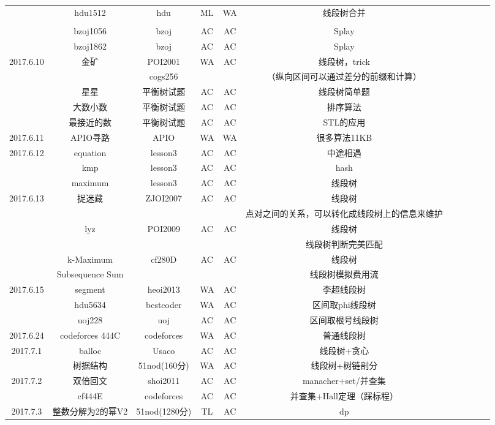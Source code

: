 \documentclass[landscape]{article}
\begin{document}
\begin{longtable}{ccccccccccc}
  & hdu1512 & hdu & ML & WA & 线段树合并\\
  & & & & & \color{red}{（拍了一万组没有出错，不知道怎么回事）}\\
   & bzoj1056 & bzoj & AC & AC & Splay\\
   & bzoj1862 & bzoj & AC & AC & Splay\\
  \hline
  2017.6.10 & 金矿 & POI2001 & WA & AC & 线段树，trick\\
  & & cogs256 & & & （纵向区间可以通过差分的前缀和计算）\\
  & 星星 & 平衡树试题 & AC & AC & 线段树简单题\\
   & 大数小数 & 平衡树试题 & AC & AC & 排序算法\\
   & 最接近的数 & 平衡树试题 & AC & AC & STL的应用\\
  \hline
  2017.6.11 & APIO寻路 & APIO & WA & WA & 很多算法11KB\\
  \hline
  2017.6.12 & equation & lesson3 & AC & AC & 中途相遇\\
   & kmp & lesson3 & AC & AC & hash\\
   & maximum & lesson3 & AC & AC & 线段树\\
  \hline
  2017.6.13 & 捉迷藏 & ZJOI2007 & AC & AC & 线段树\\
  & & & & & 点对之间的关系，可以转化成线段树上的信息来维护\\
   & lyz & POI2009 & AC & AC & 线段树\\
  & & & & & 线段树判断完美匹配\\
   & k-Maximum & cf280D & AC & AC & 线段树\\
  & Subsequence Sum & & & & 线段树模拟费用流\\
  \hline
  2017.6.15 & segment & heoi2013 & WA & AC & 李超线段树\\
   & hdu5634 & bestcoder & WA & AC & 区间取phi线段树\\
   & uoj228 & uoj & AC & AC & 区间取根号线段树\\
  \hline
  2017.6.24 & codeforces 444C & codeforces & WA & AC & 普通线段树\\
  \hline
  2017.7.1 & balloc & Usaco & AC & AC & 线段树+贪心\\
   & 树据结构 & 51nod(160分) & WA & AC & 线段树+树链剖分\\
  \hline
  2017.7.2 & 双倍回文 & shoi2011 & AC & AC & manacher+set/并查集\\
   & cf444E & codeforces & AC & AC & 并查集+Hall定理（踩标程）\\
  \hline
  2017.7.3 & 整数分解为2的幂V2 & 51nod(1280分) & TL & AC & dp\\

\end{longtable}
\end{document}
